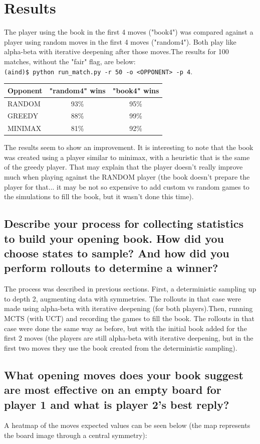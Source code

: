 \documentclass[a4paper,12pt]{article}
\begin{document}
\section{Results}
The player using the book in the first 4 moves ("book4") was compared against a player using random moves in the first 4 moves ("random4"). Both play like alpha-beta with iterative deepening after those moves.The results for 100 matches, without the "fair" flag, are below:\\
\verb+(aind)$ python run_match.py -r 50 -o <OPPONENT> -p 4+.\\

\begin{tabular}{|l|c|c|}
 \hline
Opponent & "random4" wins & "book4" wins\\
\hline
RANDOM & 93\% & 95\%\\
\hline
GREEDY & 88\% & 99\%\\
\hline
MINIMAX & 81\% & 92\%\\
\hline
\end{tabular}

The results seem to show an improvement. It is interesting to note that the book was created using a player similar to minimax, with a heuristic that is the same of the greedy player. That may explain that the player doesn't really improve much when playing against the RANDOM player (the book doesn't prepare the player for that... it may be not so expensive to add custom vs random games to the simulations to fill the book, but it wasn't done this time).

\subsection{Describe your process for collecting statistics to build your opening book. How did you choose states to sample? And how did you perform rollouts to determine a winner?}
The process was described in previous sections. First, a deterministic sampling up to depth 2, augmenting data with symmetries. The rollouts in that case were made using alpha-beta with iterative deepening (for both players).Then, running MCTS (with UCT) and recording the games to fill the book. The rollouts in that case were done the same way as before, but with the initial book added for the first 2 moves (the players are still alpha-beta with iterative deepening, but in the first two moves they use the book created from the deterministic sampling).

\subsection{What opening moves does your book suggest are most effective on an empty board for player 1 and what is player 2's best reply? }
A heatmap of the moves expected values can be seen below (the map represents the board image through a central symmetry):
\end{document}
